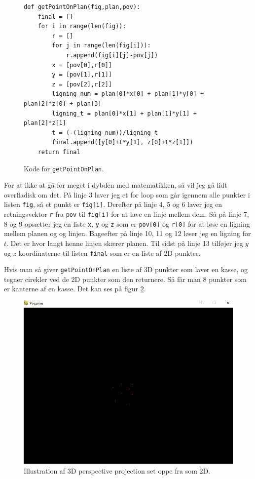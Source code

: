 \documentclass{article}
\begin{document}
\begin{figure}[H]
\begin{verbatim}
def getPointOnPlan(fig,plan,pov):
    final = []
    for i in range(len(fig)):
        r = []
        for j in range(len(fig[i])):
            r.append(fig[i][j]-pov[j])
        x = [pov[0],r[0]]
        y = [pov[1],r[1]]
        z = [pov[2],r[2]]
        ligning_num = plan[0]*x[0] + plan[1]*y[0] + plan[2]*z[0] + plan[3]
        ligning_t = plan[0]*x[1] + plan[1]*y[1] + plan[2]*z[1]
        t = (-(ligning_num))/ligning_t
        final.append([y[0]+t*y[1], z[0]+t*z[1]])
    return final
\end{verbatim}
\caption{\label{fig:getPointOnPlan}Kode for \texttt{getPointOnPlan}.}
\end{figure}

For at ikke at gå for meget i dybden med matematikken, så vil jeg gå lidt overfladisk om det.
På linje 3 laver jeg et for loop som går igennem alle punkter i listen \texttt{fig}, så et punkt er \texttt{fig[i]}.
Derefter på linje 4, 5 og 6 laver jeg en retningsvektor \texttt{r} fra \texttt{pov} til \texttt{fig[i]} for at lave en linje mellem dem.
Så på linje 7, 8 og 9 opsætter jeg en liste \texttt{x}, \texttt{y} og \texttt{z} som er \texttt{pov[0]} og \texttt{r[0]} for at løse en ligning mellem planen og og linjen.
Bageefter på linje 10, 11 og 12 løser jeg en ligning for $t$. Det er hvor langt henne linjen skærer planen.
Til sidst på linje 13 tilføjer jeg $y$ og $z$ koordinaterne til listen \texttt{final} som er en liste af 2D punkter.

Hvis man så giver \texttt{getPointOnPlan} en liste af 3D punkter som laver en kasse, 
og tegner cirekler ved de 2D punkter som den returnere.
Så får man 8 punkter som er kanterne af en kasse. Det kan ses på figur \ref{fig:8dots}.
\begin{figure}[H]
\centering
\includegraphics[width=0.7\linewidth]{8dots.png}
\caption{\label{fig:8dots}Illustration af 3D perspective projection set oppe fra som 2D.}
\end{figure}    
\end{document}
